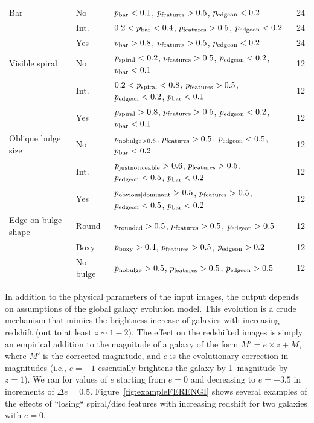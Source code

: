\documentclass[twocolumn]{aastex6}
\begin{document}
\begin{table}
\begin{tabular}{lllc}
Bar                 & No        & $p_{\rm bar} < 0.1$, $p_{\rm features} > 0.5$, $p_{\rm edgeon} < 0.2$                                 & 24 \\
                    & Int.      & $0.2 < p_{\rm bar} < 0.4$, $p_{\rm features} > 0.5$, $p_{\rm edgeon} < 0.2$                           & 24 \\
                    & Yes       & $p_{\rm bar} > 0.8$, $p_{\rm features} > 0.5$, $p_{\rm edgeon} < 0.2$                                 & 24 \\
Visible spiral      & No        & $p_{\rm spiral} < 0.2$, $p_{\rm features} > 0.5$, $p_{\rm edgeon} < 0.2$, $p_{\rm bar} < 0.1$         & 12 \\
                    & Int.      & $0.2 < p_{\rm spiral} < 0.8$, $p_{\rm features} > 0.5$, $p_{\rm edgeon} < 0.2$, $p_{\rm bar} < 0.1$   & 12 \\
                    & Yes       & $p_{\rm spiral} > 0.8$, $p_{\rm features} > 0.5$, $p_{\rm edgeon} < 0.2$, $p_{\rm bar} < 0.1$         & 12 \\
Oblique bulge size  & No        & $p_{\rm nobulge>0.6}$, $p_{\rm features} > 0.5$, $p_{\rm edgeon} < 0.5$, $p_{\rm bar} < 0.2$          & 12 \\
                    & Int.      & $p_{\rm justnoticeable}>0.6$, $p_{\rm features} > 0.5$, $p_{\rm edgeon} < 0.5$, $p_{\rm bar} < 0.2$   & 12 \\
                    & Yes       & $p_{\rm obvious|dominant}>0.5$, $p_{\rm features} > 0.5$, $p_{\rm edgeon} < 0.5$, $p_{\rm bar} < 0.2$ & 12 \\
Edge-on bulge shape & Round     & $p_{\rm rounded}>0.5$, $p_{\rm features} > 0.5$, $p_{\rm edgeon} > 0.5$                               & 12 \\
                    & Boxy      & $p_{\rm boxy}>0.4$, $p_{\rm features} > 0.5$, $p_{\rm edgeon} > 0.2$                                  & 12 \\
                    & No bulge  & $p_{\rm nobulge}>0.5$, $p_{\rm features} > 0.5$, $p_{\rm edgeon} > 0.5$                               & 12 \\
\hline\hline
\end{tabular}
\end{table}

In addition to the physical parameters of the input images, the \ferengi{} output depends on assumptions of the global galaxy evolution model. This evolution is a crude mechanism that mimics the brightness increase of galaxies with increasing redshift (out to at least $z\sim1-2$). The effect on the redshifted images is simply an empirical addition to the magnitude of a galaxy of the form $M' = e\times z + M$, where $M'$ is the corrected magnitude, and $e$ is the evolutionary correction in magnitudes (i.e., $e=-1$ essentially brightens the galaxy by 1~magnitude by $z=1$). We ran \ferengi{} for values of $e$ starting from $e=0$ and decreasing to $e=-3.5$ in increments of $\Delta e = 0.5$. Figure~\ref{fig:exampleFERENGI} shows several examples of the effects of ``losing`` spiral/disc features with increasing redshift for two galaxies with $e=0$. 
\end{document}
